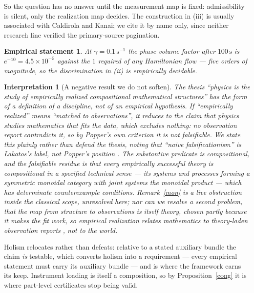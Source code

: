\documentclass[12pt,a4paper]{article}
\theoremstyle{definition}
\theoremstyle{plain}
\theoremstyle{commentary}
\newtheorem{interpretation}[definition]{Interpretation}
\newtheorem{empirical}[definition]{Empirical statement}
\begin{document}
So the question has no answer until the measurement map is fixed: admissibility is silent, only the realization map decides. The construction in (iii) is usually associated with Caldirola and Kanai; we cite it by name only, since neither research line verified the primary-source pagination.

\begin{empirical}
\label{vol}
At $\gamma=0.1\,\mathrm{s^{-1}}$ the phase-volume factor after $100\,\mathrm{s}$ is $e^{-10}=4.5\times10^{-5}$ against the $1$ required of any Hamiltonian flow --- five orders of magnitude, so the discrimination in (ii) is empirically decidable.
\end{empirical}

\begin{interpretation}[A negative result we do not soften]
\label{fals}
The thesis \emph{``physics is the study of empirically realized compositional mathematical structures''} has the form of a definition of a discipline, not of an empirical hypothesis. If ``empirically realized'' means ``matched to observations'', it reduces to the claim that physics studies mathematics that fits the data, which excludes nothing: no observation report contradicts it, so by Popper's own criterion \cite{Popper1959} it is not falsifiable. We state this plainly rather than defend the thesis, noting that ``naive falsificationism'' is Lakatos's label, not Popper's position \cite{Lakatos1970}. The substantive predicate is \emph{compositional}, and the falsifiable residue is that every empirically successful theory is compositional in a specified technical sense --- its systems and processes forming a symmetric monoidal category with joint systems the monoidal product \cite{BaezStay2011,MacLane1998} --- which has determinate counterexample conditions. Remark~\ref{mon} is a live obstruction \emph{inside} the classical scope, unresolved here; nor can we resolve a second problem, that the map from structure to observations is itself theory, chosen partly because it makes the fit work, so empirical realization relates mathematics to theory-laden observation reports \cite{Kuhn1962}, not to the world.
\end{interpretation}

Holism relocates rather than defeats: relative to a stated auxiliary bundle the claim \emph{is} testable, which converts holism into a requirement --- every empirical statement must carry its auxiliary bundle --- and is where the framework earns its keep. Instrument loading is itself a composition, so by Proposition~\ref{cong} it is where part-level certificates stop being valid.
\end{document}
